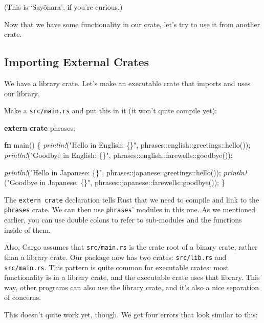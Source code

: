 \documentclass[a4paper,]{book}
\newenvironment{Shaded}{\begin{snugshade}}{\end{snugshade}}
\newcommand{\KeywordTok}[1]{\textcolor[rgb]{0.13,0.29,0.53}{\textbf{{#1}}}}
\newcommand{\StringTok}[1]{\textcolor[rgb]{0.31,0.60,0.02}{{#1}}}
\newcommand{\PreprocessorTok}[1]{\textcolor[rgb]{0.56,0.35,0.01}{\textit{{#1}}}}
\newcommand{\NormalTok}[1]{{#1}}
\begin{document}
(This is `Sayōnara', if you're curious.)

Now that we have some functionality in our crate, let's try to use it
from another crate.

\subsection{Importing External Crates}\label{importing-external-crates}

We have a library crate. Let's make an executable crate that imports and
uses our library.

Make a \texttt{src/main.rs} and put this in it (it won't quite compile
yet):

\begin{Shaded}
\begin{Highlighting}[]
\KeywordTok{extern} \KeywordTok{crate} \NormalTok{phrases;}

\KeywordTok{fn} \NormalTok{main() \{}
    \PreprocessorTok{println!}\NormalTok{(}\StringTok{"Hello in English: \{\}"}\NormalTok{, phrases::english::greetings::hello());}
    \PreprocessorTok{println!}\NormalTok{(}\StringTok{"Goodbye in English: \{\}"}\NormalTok{, phrases::english::farewells::goodbye());}

    \PreprocessorTok{println!}\NormalTok{(}\StringTok{"Hello in Japanese: \{\}"}\NormalTok{, phrases::japanese::greetings::hello());}
    \PreprocessorTok{println!}\NormalTok{(}\StringTok{"Goodbye in Japanese: \{\}"}\NormalTok{, phrases::japanese::farewells::goodbye());}
\NormalTok{\}}
\end{Highlighting}
\end{Shaded}

The \texttt{extern\ crate} declaration tells Rust that we need to
compile and link to the \texttt{phrases} crate. We can then use
\texttt{phrases}' modules in this one. As we mentioned earlier, you can
use double colons to refer to sub-modules and the functions inside of
them.

Also, Cargo assumes that \texttt{src/main.rs} is the crate root of a
binary crate, rather than a library crate. Our package now has two
crates: \texttt{src/lib.rs} and \texttt{src/main.rs}. This pattern is
quite common for executable crates: most functionality is in a library
crate, and the executable crate uses that library. This way, other
programs can also use the library crate, and it's also a nice separation
of concerns.

This doesn't quite work yet, though. We get four errors that look
similar to this:
\end{document}
